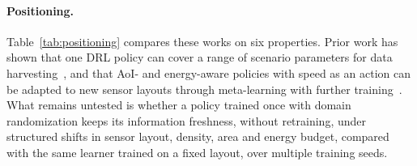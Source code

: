 \paragraph{Positioning.}
Table~\ref{tab:positioning} compares these works on six properties.
Prior work has shown that one DRL policy can cover a range of scenario parameters for data
harvesting~\cite{bayerlein2021multi}, and that AoI- and energy-aware policies with speed as
an action can be adapted to new sensor layouts through meta-learning with further
training~\cite{yi2023meta}. What remains untested is whether a policy trained once with
domain randomization keeps its information freshness, without retraining, under structured
shifts in sensor layout, density, area and energy budget, compared with the same learner
trained on a fixed layout, over multiple training seeds.

